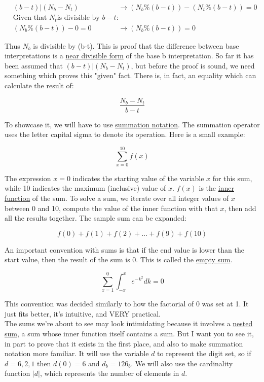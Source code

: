 \documentclass{article}
\begin{document}
\begin{align*}
&(b-t) | (N_b - N_t) & \rightarrow (N_b \% (b-t)) - (N_t \% (b-t)) = 0\\
&\text{Given that } N_t \text{is divisible by } b-t \text{:}\\
&(N_b \% (b-t)) - 0 = 0 &\rightarrow (N_b \% (b-t)) = 0
\end{align*}

\noindent Thus $N_b$ is divisible by (b-t). This is proof that the difference between base interpretations is a \underline{near divisible form} of the base b interpretation. So far it has been assumed that $(b-t) | (N_b - N_t)$, but before the proof is sound, we need something which proves this "given" fact. There is, in fact, an equality which can calculate the result of:

$$\frac{N_b - N_t}{b - t}$$

\noindent To showcase it, we will have to use \underline{summation notation}. The summation operator uses the letter capital sigma to denote its operation. Here is a small example:

$$\sum_{x=0}^{10} f(x)$$

\noindent The expression $x=0$ indicates the starting value of the variable $x$ for this sum, while 10 indicates the maximum (inclusive) value of $x$. $f(x)$ is the \underline{inner function} of the sum. To solve a sum, we iterate over all integer values of $x$ between 0 and 10, compute the value of the inner function with that $x$, then add all the results together. The sample sum can be expanded:

$$f(0) + f(1) + f(2) + ... + f(9) + f(10)$$

\noindent An important convention with sums is that if the end value is lower than the start value, then the result of the sum is 0. This is called the \underline{empty sum}.

$$\sum_{x=1}^{0} \int_{-x}^{x} e^{-k^2} dk = 0$$

\noindent This convention was decided similarly to how the factorial of 0 was set at 1. It just fits better, it's intuitive, and VERY practical.\\

\noindent The sums we're about to see may look intimidating because it involves a \underline{nested sum}, a sum whose inner function itself contains a sum. But I want you to see it, in part to prove that it exists in the first place, and also to make summation notation more familiar. It will use the variable $d$ to represent the digit set, so if $d = 6, 2, 1$ then $d(0) = 6$ and $d_b = 126_b$. We will also use the cardinality function $|d|$, which represents the number of elements in $d$.\\
\end{document}
